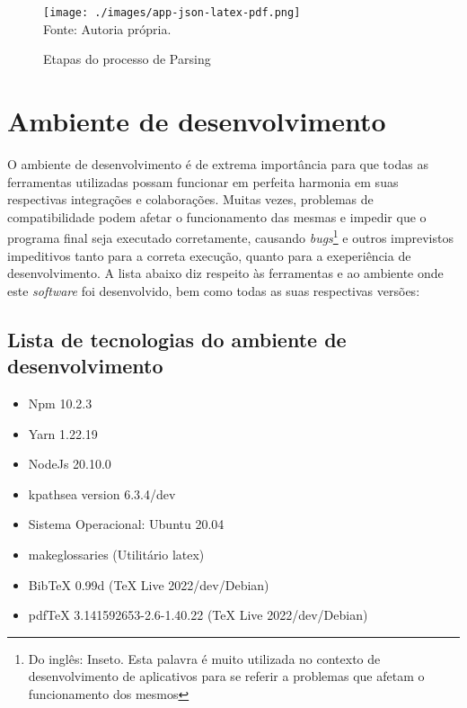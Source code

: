 \begin{figure}[ht]
    \centering
    \caption{Etapas do processo de Parsing}
    \texttt{[image: ./images/app-json-latex-pdf.png]}
    \label{fig:app-json-latex-pdf} \\
    \textnormal{\fontsize{10pt}{12pt}Fonte: Autoria própria.}
\end{figure}

\section{Ambiente de desenvolvimento}

O ambiente de desenvolvimento é de extrema importância para que todas as ferramentas
utilizadas possam funcionar em perfeita harmonia em suas respectivas integrações e
colaborações. Muitas vezes, problemas de compatibilidade podem afetar
o funcionamento das mesmas e impedir que o programa final
seja executado corretamente, causando
\textit{bugs}\footnote{Do inglês: Inseto. Esta palavra é muito utilizada no contexto de desenvolvimento de aplicativos
para se referir a problemas que afetam o funcionamento dos mesmos
}
e outros imprevistos impeditivos tanto para a correta execução, quanto
para a exeperiência de desenvolvimento.
A lista abaixo diz respeito às ferramentas e ao ambiente onde este \textit{software}
foi desenvolvido, bem como todas as suas respectivas versões:

\clearpage

\subsection{Lista de tecnologias do ambiente de desenvolvimento}

\begin{itemize}
        
	\item Npm 10.2.3
	\item Yarn 1.22.19
	\item NodeJs 20.10.0
	\item kpathsea version 6.3.4/dev
	\item Sistema Operacional: Ubuntu 20.04
	\item makeglossaries (Utilitário latex)
	\item BibTeX 0.99d (TeX Live 2022/dev/Debian)
	\item pdfTeX 3.141592653-2.6-1.40.22 (TeX Live 2022/dev/Debian)
    
\end{itemize}

